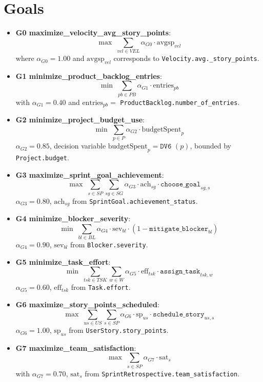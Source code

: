\documentclass[11pt,a4paper]{article}
\begin{document}
\section{Goals}
\begin{itemize}[leftmargin=2em]
  \item \textbf{G0 maximize\_velocity\_avg\_story\_points}: 
  \[
    \max \; \sum_{vel\in VEL} \alpha_{G0}\cdot \text{avgsp}_{vel}
  \]
  where $\alpha_{G0}=1.00$ and $\text{avgsp}_{vel}$ corresponds to \texttt{Velocity.avg.\_story\_points}.
  
  \item \textbf{G1 minimize\_product\_backlog\_entries}: 
  \[
    \min \; \sum_{pb\in PB} \alpha_{G1}\cdot \text{entries}_{pb}
  \]
  with $\alpha_{G1}=0.40$ and $\text{entries}_{pb}=$ \texttt{ProductBacklog.number\_of\_entries}.
  
  \item \textbf{G2 minimize\_project\_budget\_use}: 
  \[
    \min \; \sum_{p\in P} \alpha_{G2}\cdot \text{budgetSpent}_{p}
  \]
  $\alpha_{G2}=0.85$, decision variable $\text{budgetSpent}_{p}=\texttt{DV6 }(p)$, bounded by \texttt{Project.budget}.
  
  \item \textbf{G3 maximize\_sprint\_goal\_achievement}:
  \[
    \max \; \sum_{s\in SP}\sum_{sg\in SG} \alpha_{G3}\cdot \text{ach}_{sg}\cdot \texttt{choose\_goal}_{sg,s}
  \]
  $\alpha_{G3}=0.80$, $\text{ach}_{sg}$ from \texttt{SprintGoal.achievement\_status}.
  
  \item \textbf{G4 minimize\_blocker\_severity}:
  \[
    \min \; \sum_{bl\in BL} \alpha_{G4}\cdot \text{sev}_{bl}\cdot (1-\texttt{mitigate\_blocker}_{bl})
  \]
  $\alpha_{G4}=0.90$, $\text{sev}_{bl}$ from \texttt{Blocker.severity}.
  
  \item \textbf{G5 minimize\_task\_effort}:
  \[
    \min \; \sum_{tsk\in TSK}\sum_{w\in W} \alpha_{G5}\cdot \text{eff}_{tsk}\cdot \texttt{assign\_task}_{tsk,w}
  \]
  $\alpha_{G5}=0.60$, $\text{eff}_{tsk}$ from \texttt{Task.effort}.
  
  \item \textbf{G6 maximize\_story\_points\_scheduled}:
  \[
    \max \; \sum_{us\in US}\sum_{s\in SP} \alpha_{G6}\cdot \text{sp}_{us}\cdot \texttt{schedule\_story}_{us,s}
  \]
  $\alpha_{G6}=1.00$, $\text{sp}_{us}$ from \texttt{UserStory.story\_points}.
  
  \item \textbf{G7 maximize\_team\_satisfaction}:
  \[
    \max \; \sum_{s\in SP} \alpha_{G7}\cdot \text{sat}_{s}
  \]
  with $\alpha_{G7}=0.70$, $\text{sat}_{s}$ from \texttt{SprintRetrospective.team\_satisfaction}.
  

\end{itemize}
\end{document}
